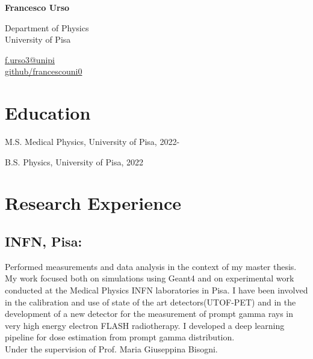 \documentclass[11pt,letterpaper]{report}
\newcommand{\myname}{Francesco Urso}
\newcommand{\namefont}[1]{{\normalfont\bfseries\Huge{#1}}}
\begin{document}
    \raggedright{}

    \namefont{\myname}

    \vspace{1em}
    \begin{minipage}[]{0.7\textwidth}
        Department of Physics \\
        University of Pisa
    \end{minipage}
    \begin{minipage}[]{0.1\textwidth}
        \flushright{}
        \href{mailto:f.urso3@studenti.unipi.it}{f.urso3@unipi} \\
     
        \href{https://github.com/francescouni0}{github/francescouni0}
    \end{minipage}


    \section*{Education}

    \begin{tablist}

        \item[M.S.]  \tab{}Medical Physics, University of Pisa, 2022-
        \item[B.S.]  \tab{}Physics, University of Pisa, 2022

    \end{tablist}



    \section*{Research Experience}

    
    \subsection*{INFN, Pisa:} Performed measurements and 
    data analysis in the context of my master thesis. My work focused
    both on simulations using Geant4 and on experimental work conducted
    at the Medical Physics INFN laboratories in Pisa. I have been 
    involved in the calibration and use of state of the art 
    detectors(UTOF-PET) and in the development of a new detector for
    the measurement of prompt gamma rays in very high energy electron FLASH
    radiotherapy. I developed a deep learning pipeline for dose estimation 
    from prompt gamma distribution.
     \\Under the supervision of Prof. Maria Giuseppina Bisogni.
\end{document}
